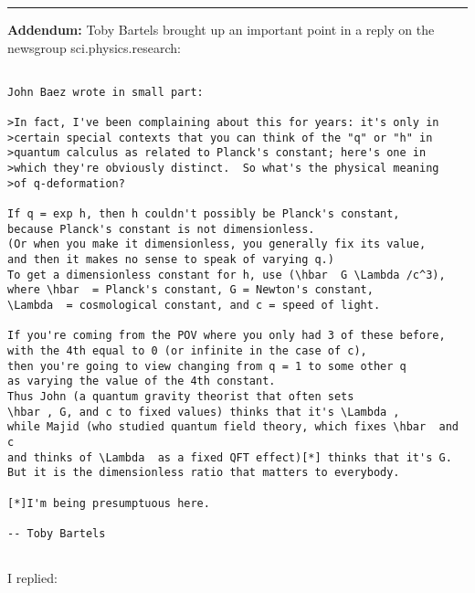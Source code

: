 \par\noindent\rule{\textwidth}{0.4pt}
\textbf{Addendum:} Toby Bartels brought up an important point in a reply
on the newsgroup sci.physics.research:


\begin{verbatim}

John Baez wrote in small part:

>In fact, I've been complaining about this for years: it's only in
>certain special contexts that you can think of the "q" or "h" in
>quantum calculus as related to Planck's constant; here's one in
>which they're obviously distinct.  So what's the physical meaning
>of q-deformation?

If q = exp h, then h couldn't possibly be Planck's constant,
because Planck's constant is not dimensionless.
(Or when you make it dimensionless, you generally fix its value,
and then it makes no sense to speak of varying q.)
To get a dimensionless constant for h, use (\hbar  G \Lambda /c^3),
where \hbar  = Planck's constant, G = Newton's constant,
\Lambda  = cosmological constant, and c = speed of light.

If you're coming from the POV where you only had 3 of these before,
with the 4th equal to 0 (or infinite in the case of c),
then you're going to view changing from q = 1 to some other q
as varying the value of the 4th constant.
Thus John (a quantum gravity theorist that often sets
\hbar , G, and c to fixed values) thinks that it's \Lambda ,
while Majid (who studied quantum field theory, which fixes \hbar  and c
and thinks of \Lambda  as a fixed QFT effect)[*] thinks that it's G.
But it is the dimensionless ratio that matters to everybody.

[*]I'm being presumptuous here.

-- Toby Bartels


\end{verbatim}
    

I replied:

